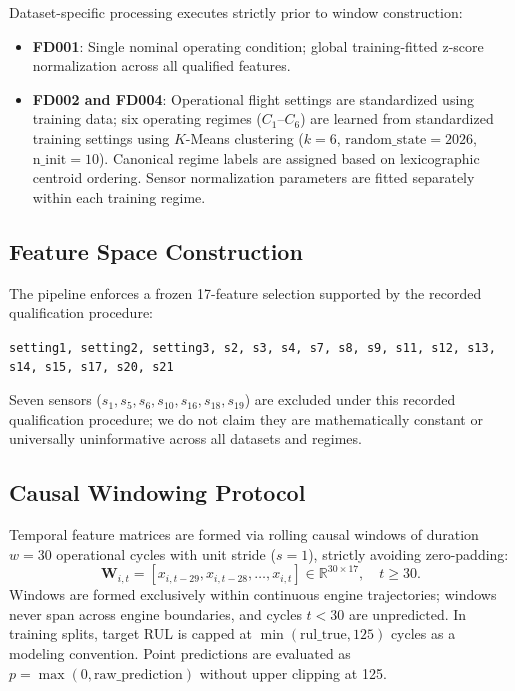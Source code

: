 Dataset-specific processing executes strictly prior to window construction:
\begin{itemize}
    \item \textbf{FD001}: Single nominal operating condition; global training-fitted z-score normalization across all qualified features.
    \item \textbf{FD002 and FD004}: Operational flight settings are standardized using training data; six operating regimes ($C_1$--$C_6$) are learned from standardized training settings using $K$-Means clustering ($k=6$, $\text{random\_state}=2026$, $\text{n\_init}=10$). Canonical regime labels are assigned based on lexicographic centroid ordering. Sensor normalization parameters are fitted separately within each training regime.
\end{itemize}

\subsection{Feature Space Construction}
The pipeline enforces a frozen 17-feature selection supported by the recorded qualification procedure:
\begin{center}
\texttt{setting1, setting2, setting3, s2, s3, s4, s7, s8, s9, s11, s12, s13, s14, s15, s17, s20, s21}
\end{center}
Seven sensors ($s_1, s_5, s_6, s_{10}, s_{16}, s_{18}, s_{19}$) are excluded under this recorded qualification procedure; we do not claim they are mathematically constant or universally uninformative across all datasets and regimes.

\subsection{Causal Windowing Protocol}
Temporal feature matrices are formed via rolling causal windows of duration $w = 30$ operational cycles with unit stride ($s = 1$), strictly avoiding zero-padding:
\begin{equation}
\mathbf{W}_{i,t} = [x_{i, t-29}, x_{i, t-28}, \dots, x_{i,t}] \in \mathbb{R}^{30 \times 17}, \quad t \ge 30.
\end{equation}
Windows are formed exclusively within continuous engine trajectories; windows never span across engine boundaries, and cycles $t < 30$ are unpredicted. In training splits, target RUL is capped at $\min(\text{rul\_true}, 125)$ cycles as a modeling convention. Point predictions are evaluated as $p = \max(0, \text{raw\_prediction})$ without upper clipping at 125.

